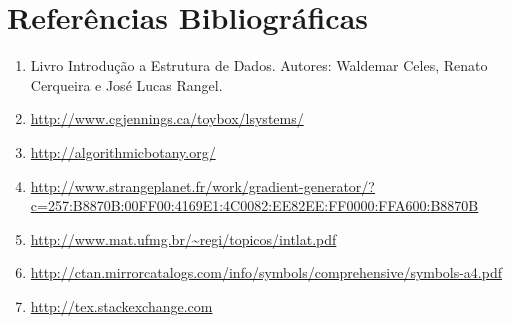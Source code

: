 \documentclass[a4paper,12pt]{article}%
\begin{document}
\section{Referências Bibliográficas}
\begin{enumerate}
\item Livro Introdução a Estrutura de Dados. Autores: Waldemar Celes, Renato Cerqueira e José Lucas Rangel.
\item \url{http://www.cgjennings.ca/toybox/lsystems/}
\item \url{http://algorithmicbotany.org/}
\item \label{GradientGenerator} \url{http://www.strangeplanet.fr/work/gradient-generator/?c=257:B8870B:00FF00:4169E1:4C0082:EE82EE:FF0000:FFA600:B8870B}
\item \url{http://www.mat.ufmg.br/~regi/topicos/intlat.pdf} 
\item \url{http://ctan.mirrorcatalogs.com/info/symbols/comprehensive/symbols-a4.pdf}
\item \url{http://tex.stackexchange.com} 
\end{enumerate}
\end{document}
